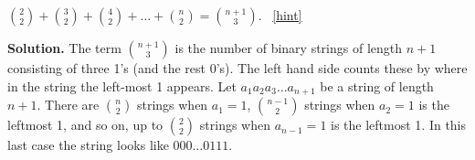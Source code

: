 \documentclass{book}
\begin{document}
\setcounter{project}{102}
\addtocounter{project}{-1}
\begin{activity}[]\label{activity-95}
\hypertarget{p-752}{}%
\(\binom{2}{2} + \binom{3}{2} + \binom{4}{2} + \ldots + \binom{n}{2} = \binom{n + 1}{3}\).%
~\hfill{\tiny\hyperlink{a-102}{[hint]}\hypertarget{q-102}{}}\par\smallskip%
\noindent\textbf{Solution.}\hypertarget{solution-76}{}\quad%
\hypertarget{p-754}{}%
The term \(\binom{n + 1}{3}\) is the number of binary strings of length \(n + 1\) consisting of three 1's (and the rest 0's). The left hand side counts these by where in the string the left-most 1 appears. Let \(a_{1}a_{2}a_{3}\ldots a_{n + 1}\) be a string of length \(n + 1\). There are \(\binom{n}{2}\) strings when \(a_{1} = 1\), \(\binom{n - 1}{2}\) strings when \(a_{2} = 1\) is the leftmost 1, and so on, up to \(\binom{2}{2}\) strings when \(a_{n - 1} = 1\) is the leftmost 1. In this last case the string looks like \(000\ldots 0111\).%
\end{activity}
\end{document}
